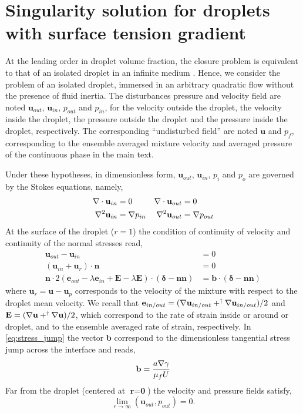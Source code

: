 \section{Singularity solution for droplets with surface tension gradient}
\label{ap:singularity_solution}
At the leading order in droplet volume fraction, the closure problem is equivalent to that of an isolated droplet in an infinite medium \citet{hinch1977averaged}. 
Hence, we consider the problem of an isolated droplet, immersed in an arbitrary quadratic flow without the presence of fluid inertia. 
The disturbances pressure and velocity field are noted $\textbf{u}_{out}$, $\textbf{u}_{in}$, $p_{out}$ and $p_{in}$, for the velocity outside the droplet, the velocity inside the droplet, the pressure outside the droplet and the pressure inside the droplet, respectively. 
The corresponding ``undisturbed field'' are noted $\textbf{u}$ and $p_f$, corresponding to the ensemble averaged mixture velocity and averaged pressure of the continuous phase in the main text. 

Under these hypotheses, in dimensionless form, $\textbf{u}_{out}$, $\textbf{u}_{in}$, $p_i$ and $p_o$ are governed by the Stokes equations, namely, 
\begin{align}
    \mathbf{\nabla}\cdot \textbf{u}_{in} &= 0 
    & \mathbf{\nabla}\cdot \textbf{u}_{out} &= 0 \\
     \mathbf{\nabla}^2 \textbf{u}_{in}  &= \mathbf{\nabla} p_{in} 
    & \mathbf{\nabla}^2 \textbf{u}_{out} &= \mathbf{\nabla} p_{out} 
\end{align}
At the surface of the droplet ($r=1$) the condition of continuity of velocity and continuity of the normal stresses read, 
\begin{align}
    \label{eq:vel_jump}
    \textbf{u}_{out} - \textbf{u}_{in} &= 0\\
    \label{eq:vel_jump2}
    (\textbf{u}_{in}  + \textbf{u}_r)\cdot \textbf{n}
    &= 0\\
    \mathbf{n}\cdot 2(\textbf{e}_{out} - \lambda \textbf{e}_{in}+\textbf{E} -\lambda\textbf{E} )\cdot (\bm\delta - \textbf{nn})
    &= 
    \textbf{b}\cdot (\bm\delta - \textbf{nn})
    \label{eq:stress_jump}
\end{align}
where $\textbf{u}_r = \textbf{u} - \textbf{u}_p$ corresponds to the velocity of the mixture with respect to the droplet mean velocity. 
We recall that $\textbf{e}_{in/out} = (\mathbf{\nabla} \textbf{u}_{in/out} + ^\dagger \mathbf{\nabla} \textbf{u}_{in/out})/2 $ and $\textbf{E} = (\mathbf{\nabla} \textbf{u} + ^\dagger \mathbf{\nabla} \textbf{u})/2$, which correspond to the rate of strain inside or around or droplet, and to the ensemble averaged rate of strain, respectively. 
In \ref{eq:stress_jump} the vector \textbf{b} correspond to the dimensionless tangential stress jump across the interface and reads, 
\begin{equation}
    \textbf{b}
    =
    \frac{a \mathbf{\nabla} \gamma}{\mu_f U}
\end{equation}
Far from the droplet (centered at $\textbf{r}=\textbf{0}$) the velocity and pressure fields satisfy, 
\begin{equation}
    \lim_{r\to \infty}(\textbf{u}_{out},p_{out}) = 0. 
\end{equation}

